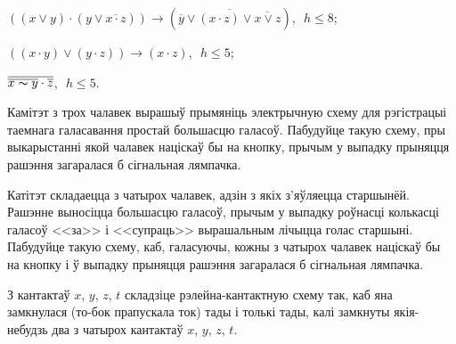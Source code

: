 \begin{problemList}
\begin{belarusianEnumerate}
			\item $((x \vee y) \cdot (y \vee \overline{x \cdot z})) \to (\overline{\overline{y} \vee
				(x \cdot z) \vee \overline{x \vee z}})$,\,\, $h \le 8$;
			
			\item $((x \cdot y) \vee (y \cdot z)) \to (x \cdot z)$,\,\, $h \le 5$;
			
			\item $\overline{\overline{x \thicksim y} \cdot \overline{z}}$,\,\, $h \le 5$.
		\end{belarusianEnumerate}
	
		\bigskip
		
		\item Камітэт з трох чалавек вырашыў прымяніць электрычную схему для рэгістрацыі таемнага галасавання простай большасцю галасоў. Пабудуйце такую схему, пры выкарыстанні якой чалавек націскаў бы на кнопку, прычым у выпадку прыняцця рашэння загаралася б сігнальная лямпачка.\\
		
		\bigskip
		
		\item Катітэт складаецца з чатырох чалавек, адзін з якіх з'яўляецца старшынёй. Рашэнне выносіцца большасцю галасоў, прычым у выпадку роўнасці колькасці галасоў <<за>> і <<супраць>> вырашальным лічыцца голас старшыні. Пабудуйце такую схему, каб, галасуючы, кожны з чатырох чалавек націскаў бы на кнопку і ў выпадку прыняцця рашэння загаралася б сігнальная лямпачка. \\
		
		 \bigskip
		 
		 \item З кантактаў $x$, $y$, $z$, $t$ складзіце рэлейна-кантактную схему так, каб яна замкнулася (то-бок прапускала ток) тады і толькі тады, калі замкнуты якія-небудзь два з чатырох кантактаў $x$, $y$, $z$, $t$. \\
	\end{problemList}
